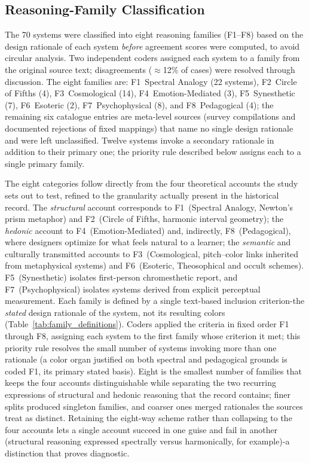 \documentclass[12pt]{article}
\begin{document}
\subsection{Reasoning-Family Classification}
The 70 systems were classified into eight reasoning families (F1--F8)
based on the design rationale of each system \emph{before} agreement
scores were computed, to avoid circular analysis. Two independent
coders assigned each system to a family from the original source text;
disagreements ($\approx$12\% of cases) were resolved through discussion.
The eight families are: F1~Spectral Analogy (22 systems), F2~Circle of
Fifths (4), F3~Cosmological (14), F4~Emotion-Mediated (3),
F5~Synesthetic (7), F6~Esoteric (2), F7~Psychophysical (8), and
F8~Pedagogical (4); the remaining six catalogue entries are meta-level
sources (survey compilations and documented rejections of fixed
mappings) that name no single design rationale and were left
unclassified. Twelve systems invoke a secondary rationale in addition
to their primary one; the priority rule described below assigns each
to a single primary family.

The eight categories follow directly from the four theoretical accounts
the study sets out to test, refined to the granularity actually present
in the historical record. The \emph{structural} account corresponds to
F1~(Spectral Analogy, Newton's prism metaphor) and F2~(Circle of
Fifths, harmonic interval geometry); the \emph{hedonic} account to
F4~(Emotion-Mediated) and, indirectly, F8~(Pedagogical), where
designers optimize for what feels natural to a learner; the
\emph{semantic} and culturally transmitted accounts to
F3~(Cosmological, pitch--color links inherited from metaphysical
systems) and F6~(Esoteric, Theosophical and occult schemes).
F5~(Synesthetic) isolates first-person chromesthetic report, and
F7~(Psychophysical) isolates systems derived from explicit perceptual
measurement. Each family is defined by a single text-based inclusion
criterion-the \emph{stated} design rationale of the system, not its
resulting colors (Table~\ref{tab:family_definitions}). Coders applied
the criteria in fixed order F1 through F8, assigning each system to the
first family whose criterion it met; this priority rule resolves the
small number of systems invoking more than one rationale (a color organ
justified on both spectral and pedagogical grounds is coded F1, its
primary stated basis). Eight is the smallest number of families that
keeps the four accounts distinguishable while separating the two
recurring expressions of structural and hedonic reasoning that the
record contains; finer splits produced singleton families, and coarser
ones merged rationales the sources treat as distinct. Retaining the
eight-way scheme rather than collapsing to the four accounts lets a
single account succeed in one guise and fail in another (structural
reasoning expressed spectrally versus harmonically, for example)-a
distinction that proves diagnostic.
\end{document}
